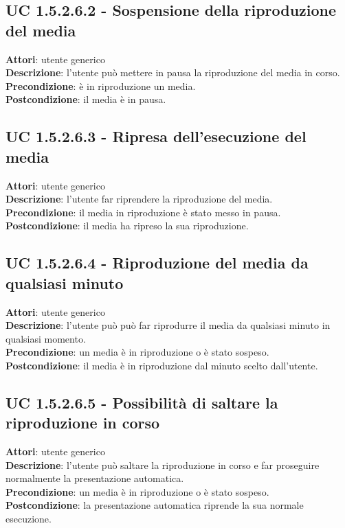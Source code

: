 	\subsection{UC 1.5.2.6.2 - Sospensione della riproduzione del media}{
		\label{uc1.5.2.6.2}
		\textbf{Attori}: utente generico \\
		\textbf{Descrizione}: l'utente può mettere in pausa la riproduzione del media in corso. \\
		\textbf{Precondizione}: è in riproduzione un media.	\\
		\textbf{Postcondizione}: il media è in pausa.	\\
	}
	\subsection{UC 1.5.2.6.3 - Ripresa dell'esecuzione del media}{
		\label{uc1.5.2.6.3}
		\textbf{Attori}: utente generico \\
		\textbf{Descrizione}: l'utente far riprendere la riproduzione del media. \\
		\textbf{Precondizione}: il media in riproduzione è stato messo in pausa.	\\
		\textbf{Postcondizione}: il media ha ripreso la sua riproduzione.	\\
	}
	\subsection{UC 1.5.2.6.4 - Riproduzione del media da qualsiasi minuto}{
		\label{uc1.5.2.6.4}
		\textbf{Attori}: utente generico \\
		\textbf{Descrizione}: l'utente può può far riprodurre il media da qualsiasi minuto in qualsiasi momento. \\
		\textbf{Precondizione}: un media è in riproduzione o è stato sospeso.	\\
		\textbf{Postcondizione}: il media è in riproduzione dal minuto scelto dall'utente.	\\
	}
	\subsection{UC 1.5.2.6.5 - Possibilità di saltare la riproduzione in corso}{
		\label{uc1.5.2.6.5}
		\textbf{Attori}: utente generico \\
		\textbf{Descrizione}: l'utente può saltare la riproduzione in corso e far proseguire normalmente la presentazione automatica. \\
		\textbf{Precondizione}: un media è in riproduzione o è stato sospeso.	\\
		\textbf{Postcondizione}: la presentazione automatica riprende la sua normale esecuzione.	\\
	}
